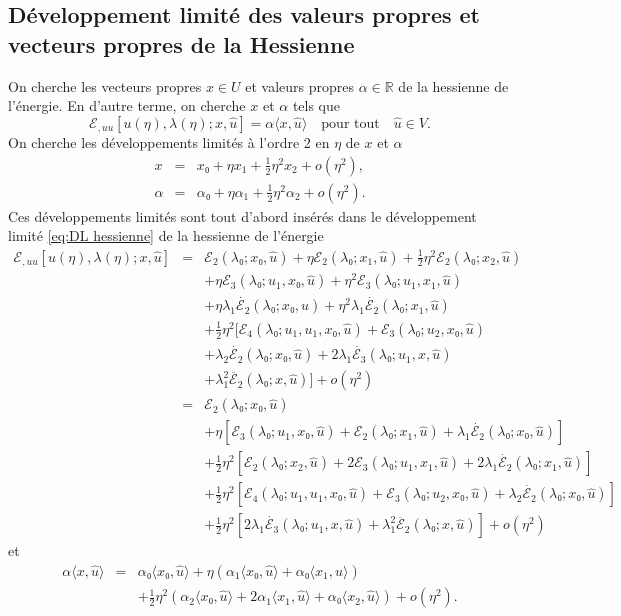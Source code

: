 \documentclass{article}
\begin{document}
\subsection{Développement limité des valeurs propres et vecteurs
propres de la Hessienne}

On cherche les vecteurs propres $x∈U$ et valeurs propres $α \in
\mathbb{R}$ de la hessienne de l'énergie. En d'autre terme, on cherche $x$
et $α$ tels que
\begin{equation}
  ℰ_{, u  u} [u (η), λ (η) ; x, \hat{u}] =
  α \langle x, \hat{u} \rangle \quad \text{pour tout} \quad \hat{u} \in
  V.
\end{equation}
On cherche les développements limités à l'ordre 2 en $η$ de $x$
et $α$
\begin{eqnarray*}
  x & = & x₀ + η x_1 + \tfrac{1}{2} η^2 x_2 + o (η^2),\\
  α & = & α₀ + η α_1 + \tfrac{1}{2} η^2 α_2 + o
  (η^2) .
\end{eqnarray*}
Ces développements limités sont tout d'abord insérés dans le
développement limité \eqref{eq:DL hessienne} de la hessienne de
l'énergie
\begin{eqnarray*}
  ℰ_{, u  u} [u (η), λ (η) ; x, \hat{u}] & = &
  ℰ_2 (λ₀ ; x₀, \hat{u}) + η ℰ_2 (λ₀ ;
  x_1, \hat{u}) + \tfrac{1}{2} η^2 ℰ_2 (λ₀ ; x_2,
  \hat{u})\\
  &  & + η ℰ_3 (λ₀ ; u_1, x₀, \hat{u}) + η^2
  ℰ_3 (λ₀ ; u_1, x_1, \hat{u})\\
  &  & + η λ_1  \dot{ℰ_2} (λ₀ ; x₀, \hat{u}) +
  η^2 λ_1  \dot{ℰ_2} (λ₀ ; x_1, \hat{u})\\
  &  & + \tfrac{1}{2} η^2  [ℰ_4 (λ₀ ; u_1, u_1, x₀,
  \hat{u})  +ℰ_3 (λ₀ ; u_2, x₀, \hat{u})\\
  &  & + λ_2  \dot{ℰ_2} (λ₀ ; x₀, \hat{u}) + 2
  λ_1  \dot{ℰ_3} (λ₀ ; u_1, x, \hat{u})\\
  &  & + λ_1^2  \ddot{ℰ_2} (λ₀ ; x, \hat{u})
  ] + o (η^2)\\
  & = & ℰ_2 (λ₀ ; x₀, \hat{u})\\
  &  & + η [ℰ_3 (λ₀ ; u_1, x₀, \hat{u}) +ℰ_2
  (λ₀ ; x_1, \hat{u}) + λ_1  \dot{ℰ_2} (λ₀ ;
  x₀, \hat{u})]\\
  &  & + \tfrac{1}{2} η^2  [ℰ_2 (λ₀ ; x_2, \hat{u}) +
  2ℰ_3 (λ₀ ; u_1, x_1, \hat{u}) + 2 λ_1
  \dot{ℰ_2} (λ₀ ; x_1, \hat{u})]\\
  &  & + \tfrac{1}{2} η^2  [ℰ_4 (λ₀ ; u_1, u_1, x₀,
  \hat{u}) +ℰ_3 (λ₀ ; u_2, x₀, \hat{u}) + λ_2
  \dot{ℰ_2} (λ₀ ; x₀, \hat{u})]\\
  &  & + \tfrac{1}{2} η^2  [2 λ_1  \dot{ℰ_3} (λ₀ ;
  u_1, x, \hat{u}) + λ_1^2  \ddot{ℰ_2} (λ₀ ; x,
  \hat{u})] + o (η^2)
\end{eqnarray*}
et
\begin{eqnarray*}
  α \langle x, \hat{u} \rangle & = & α₀  \langle x₀, \hat{u}
  \rangle + η (α_1 \langle x₀, \hat{u} \rangle + α₀ \langle
  x_1, \hat{u} \rangle)\\
  &  & + \tfrac{1}{2} η^2  (α_2 \langle x₀, \hat{u} \rangle + 2
  α_1 \langle x_1, \hat{u} \rangle + α₀ \langle x_2, \hat{u}
  \rangle) + o (η^2) .
\end{eqnarray*}
\end{document}
